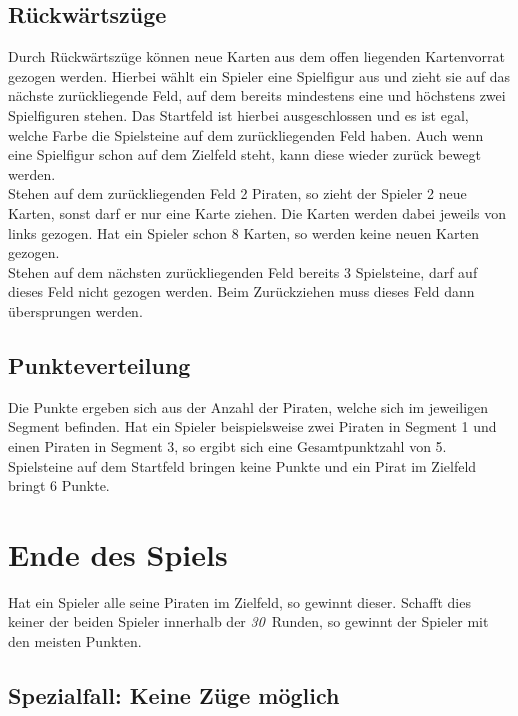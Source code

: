 \documentclass[a4paper, ngerman]{scrartcl}
\newcommand{\RundenAnzahl}{\emph{30}}
\begin{document}
\subsection{Rückwärtszüge}
Durch Rückwärtszüge können neue Karten aus dem offen liegenden Kartenvorrat
gezogen werden.
Hierbei wählt ein Spieler eine Spielfigur aus und zieht sie auf das nächste
zurückliegende Feld, auf dem bereits mindestens eine und höchstens zwei
Spielfiguren stehen. Das Startfeld ist hierbei ausgeschlossen und es ist egal,
welche Farbe die Spielsteine auf dem zurückliegenden Feld haben. Auch wenn eine
Spielfigur schon auf dem Zielfeld steht, kann diese wieder zurück bewegt
werden.\\
Stehen auf dem zurückliegenden Feld 2 Piraten, so zieht der Spieler 2 neue
Karten, sonst darf er nur eine Karte ziehen. Die Karten werden dabei jeweils von
links gezogen. Hat ein Spieler schon 8 Karten, so werden keine neuen Karten
gezogen.\\
Stehen auf dem nächsten zurückliegenden Feld bereits 3 Spielsteine, darf auf
dieses Feld nicht gezogen werden. Beim Zurückziehen muss dieses Feld dann
übersprungen werden.
	
	\subsection{Punkteverteilung}
	Die Punkte ergeben sich aus der Anzahl der Piraten, welche sich im jeweiligen
	Segment befinden. Hat ein Spieler beispielsweise zwei Piraten in Segment 1 und
	einen Piraten in Segment 3, so ergibt sich eine Gesamtpunktzahl von 5.\\
	Spielsteine auf dem Startfeld bringen keine Punkte und ein Pirat im Zielfeld
	bringt 6 Punkte.
	
\section{Ende des Spiels}

	Hat ein Spieler alle seine Piraten im Zielfeld, so gewinnt dieser. Schafft dies
	keiner der beiden Spieler innerhalb der \RundenAnzahl\ Runden, so
	gewinnt der Spieler mit den meisten Punkten.
\subsection{Spezialfall: Keine Züge möglich}
	
\end{document}
